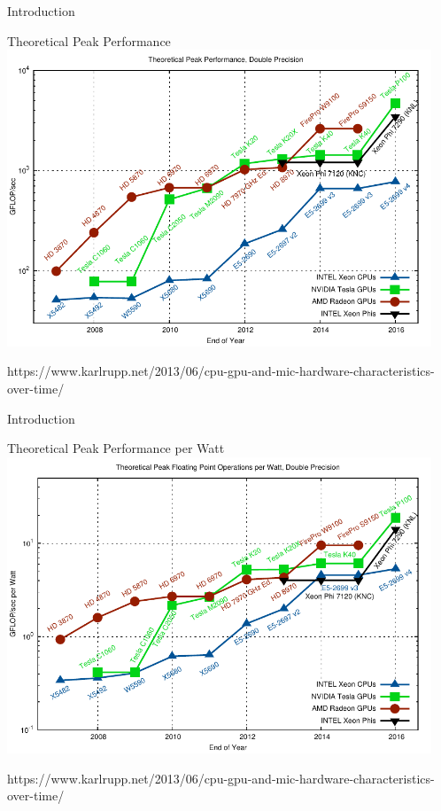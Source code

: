 \begin{frame}{Introduction}
 \vspace*{-0.5cm}
 \begin{center}
  Theoretical Peak Performance \\
  \includegraphics[width=0.95\textwidth]{figures/gflops-dp}
 \end{center}
 \vspace*{-0.5cm}
 {\tiny https://www.karlrupp.net/2013/06/cpu-gpu-and-mic-hardware-characteristics-over-time/ }
\end{frame}

\begin{frame}{Introduction}
 \vspace*{-0.5cm}
 \begin{center}
  Theoretical Peak Performance per Watt \\
  \includegraphics[width=0.95\textwidth]{figures/gflops-per-watt-dp}
 \end{center}
 \vspace*{-0.5cm}
 {\tiny https://www.karlrupp.net/2013/06/cpu-gpu-and-mic-hardware-characteristics-over-time/ }
\end{frame}

